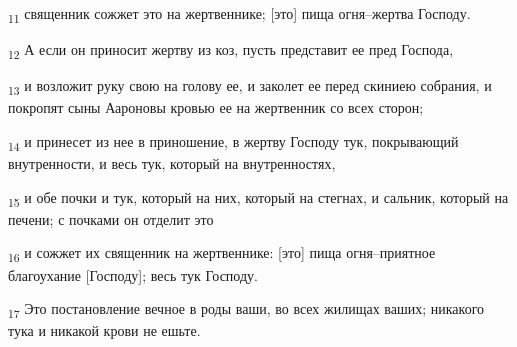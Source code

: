\begin{tcolorbox}
\textsubscript{11} священник сожжет это на жертвеннике; [это] пища огня--жертва Господу.
\end{tcolorbox}
\begin{tcolorbox}
\textsubscript{12} А если он приносит жертву из коз, пусть представит ее пред Господа,
\end{tcolorbox}
\begin{tcolorbox}
\textsubscript{13} и возложит руку свою на голову ее, и заколет ее перед скиниею собрания, и покропят сыны Аароновы кровью ее на жертвенник со всех сторон;
\end{tcolorbox}
\begin{tcolorbox}
\textsubscript{14} и принесет из нее в приношение, в жертву Господу тук, покрывающий внутренности, и весь тук, который на внутренностях,
\end{tcolorbox}
\begin{tcolorbox}
\textsubscript{15} и обе почки и тук, который на них, который на стегнах, и сальник, который на печени; с почками он отделит это
\end{tcolorbox}
\begin{tcolorbox}
\textsubscript{16} и сожжет их священник на жертвеннике: [это] пища огня--приятное благоухание [Господу]; весь тук Господу.
\end{tcolorbox}
\begin{tcolorbox}
\textsubscript{17} Это постановление вечное в роды ваши, во всех жилищах ваших; никакого тука и никакой крови не ешьте.
\end{tcolorbox}
